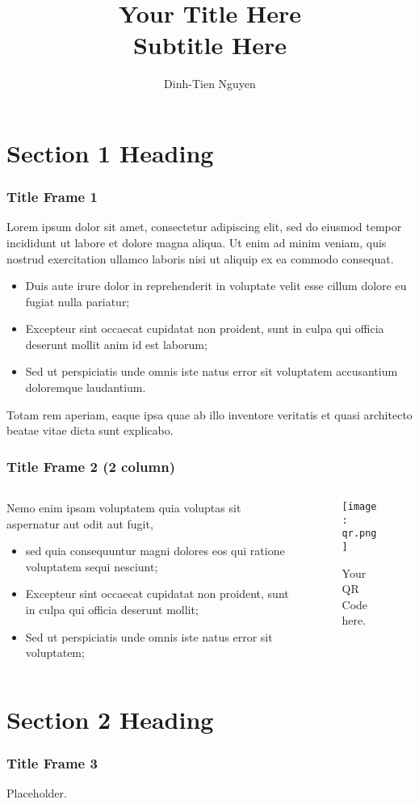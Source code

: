 \documentclass{beamer}
\title[ACRONYM] %
{Your Title Here\\
Subtitle Here}
\author[] %
{Dinh-Tien Nguyen}
\institute[] %
{
Faculty of Physics\\
VNU University of Science
}
\date{}
\begin{document}
\frame{\titlepage}
\tableofcontents

\section{Section 1 Heading}
\begin{frame}
    \frametitle{Title Frame 1}
    Lorem ipsum dolor sit amet, consectetur adipiscing elit, sed do eiusmod tempor incididunt ut labore et dolore magna aliqua. Ut enim ad minim veniam, quis nostrud exercitation ullamco laboris nisi ut aliquip ex ea commodo consequat.
            \begin{itemize}
                \item Duis aute irure dolor in reprehenderit in voluptate velit esse cillum dolore eu fugiat nulla pariatur;
                \item Excepteur sint occaecat cupidatat non proident, sunt in culpa qui officia deserunt mollit anim id est laborum;
                \item Sed ut perspiciatis unde omnis iste natus error sit voluptatem accusantium doloremque laudantium.
            \end{itemize}
    Totam rem aperiam, eaque ipsa quae ab illo inventore veritatis et quasi architecto beatae vitae dicta sunt explicabo. 
\end{frame}
\begin{frame}
    \frametitle{Title Frame 2 (2 column)}
    \begin{columns}
        \begin{column}{0.6\textwidth}
            Nemo enim ipsam voluptatem quia voluptas sit aspernatur aut odit aut fugit,
            \begin{itemize}
                \item sed quia consequuntur magni dolores eos qui ratione voluptatem sequi nesciunt;
                \item Excepteur sint occaecat cupidatat non proident, sunt in culpa qui officia deserunt mollit;
                \item Sed ut perspiciatis unde omnis iste natus error sit voluptatem;
            \end{itemize}
        \end{column}
        \begin{column}{0.4\textwidth}
            \begin{figure}
                \centering 
                \texttt{[image: qr.png]}
                \caption{Your QR Code here.}
            \end{figure}
        \end{column}
    \end{columns}
\end{frame}

\section{Section 2 Heading}
\begin{frame}
    \frametitle{Title Frame 3}
    Placeholder.
    

\end{frame}
\end{document}
